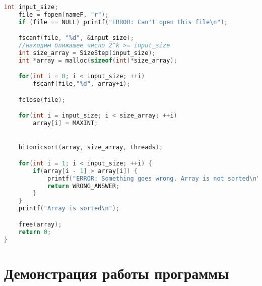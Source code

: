 \documentclass[pdf, unicode, 12pt, a4paper,oneside,fleqn]{article}
\begin{document}
\begin{lstlisting}[language=C]
    int input_size;
    file = fopen(nameF, "r");
    if (file == NULL) printf("ERROR: Can't open this file\n");

    fscanf(file, "%d", &input_size);
    //находим ближашее число 2^k >= input_size
    int size_array = SizeStep(input_size);
    int *array = malloc(sizeof(int)*size_array);

    for(int i = 0; i < input_size; ++i)
        fscanf(file,"%d", array+i);

    fclose(file);

    for(int i = input_size; i < size_array; ++i)
        array[i] = MAXINT;


    bitonicsort(array, size_array, threads);

    for(int i = 1; i < input_size; ++i) {
        if(array[i - 1] > array[i]) {
            printf("ERROR: Something goes wrong. Array is not sorted\n");
            return WRONG_ANSWER;
        }
    }
    printf("Array is sorted\n");

    free(array);
    return 0;
}
\end{lstlisting}

\section{Демонстрация работы программы}
\end{document}
